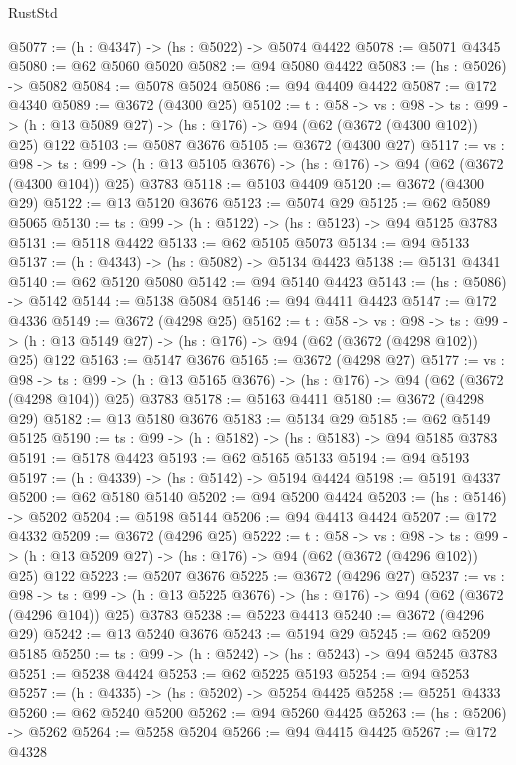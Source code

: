 \begin{lexlean}{RustStd}
\begin{coremodule}
{\begin{coremodule}
{{{{{{{{{{{@5077 := (h : @4347) -> (hs : @5022) -> @5074 @4422
@5078 := @5071 @4345
@5080 := @62 @5060 @5020
@5082 := @94 @5080 @4422
@5083 := (hs : @5026) -> @5082
@5084 := @5078 @5024
@5086 := @94 @4409 @4422
@5087 := @172 @4340
@5089 := @3672 (@4300 @25)
@5102 := {t : @58} ->
  {vs : @98} ->
  {ts : @99} -> (h : @13 @5089 @27) -> (hs : @176) -> @94 (@62 (@3672 (@4300 @102)) @25) @122
@5103 := @5087 @3676
@5105 := @3672 (@4300 @27)
@5117 := {vs : @98} ->
  {ts : @99} -> (h : @13 @5105 @3676) -> (hs : @176) -> @94 (@62 (@3672 (@4300 @104)) @25) @3783
@5118 := @5103 @4409
@5120 := @3672 (@4300 @29)
@5122 := @13 @5120 @3676
@5123 := @5074 @29
@5125 := @62 @5089 @5065
@5130 := {ts : @99} -> (h : @5122) -> (hs : @5123) -> @94 @5125 @3783
@5131 := @5118 @4422
@5133 := @62 @5105 @5073
@5134 := @94 @5133
@5137 := (h : @4343) -> (hs : @5082) -> @5134 @4423
@5138 := @5131 @4341
@5140 := @62 @5120 @5080
@5142 := @94 @5140 @4423
@5143 := (hs : @5086) -> @5142
@5144 := @5138 @5084
@5146 := @94 @4411 @4423
@5147 := @172 @4336
@5149 := @3672 (@4298 @25)
@5162 := {t : @58} ->
  {vs : @98} ->
  {ts : @99} -> (h : @13 @5149 @27) -> (hs : @176) -> @94 (@62 (@3672 (@4298 @102)) @25) @122
@5163 := @5147 @3676
@5165 := @3672 (@4298 @27)
@5177 := {vs : @98} ->
  {ts : @99} -> (h : @13 @5165 @3676) -> (hs : @176) -> @94 (@62 (@3672 (@4298 @104)) @25) @3783
@5178 := @5163 @4411
@5180 := @3672 (@4298 @29)
@5182 := @13 @5180 @3676
@5183 := @5134 @29
@5185 := @62 @5149 @5125
@5190 := {ts : @99} -> (h : @5182) -> (hs : @5183) -> @94 @5185 @3783
@5191 := @5178 @4423
@5193 := @62 @5165 @5133
@5194 := @94 @5193
@5197 := (h : @4339) -> (hs : @5142) -> @5194 @4424
@5198 := @5191 @4337
@5200 := @62 @5180 @5140
@5202 := @94 @5200 @4424
@5203 := (hs : @5146) -> @5202
@5204 := @5198 @5144
@5206 := @94 @4413 @4424
@5207 := @172 @4332
@5209 := @3672 (@4296 @25)
@5222 := {t : @58} ->
  {vs : @98} ->
  {ts : @99} -> (h : @13 @5209 @27) -> (hs : @176) -> @94 (@62 (@3672 (@4296 @102)) @25) @122
@5223 := @5207 @3676
@5225 := @3672 (@4296 @27)
@5237 := {vs : @98} ->
  {ts : @99} -> (h : @13 @5225 @3676) -> (hs : @176) -> @94 (@62 (@3672 (@4296 @104)) @25) @3783
@5238 := @5223 @4413
@5240 := @3672 (@4296 @29)
@5242 := @13 @5240 @3676
@5243 := @5194 @29
@5245 := @62 @5209 @5185
@5250 := {ts : @99} -> (h : @5242) -> (hs : @5243) -> @94 @5245 @3783
@5251 := @5238 @4424
@5253 := @62 @5225 @5193
@5254 := @94 @5253
@5257 := (h : @4335) -> (hs : @5202) -> @5254 @4425
@5258 := @5251 @4333
@5260 := @62 @5240 @5200
@5262 := @94 @5260 @4425
@5263 := (hs : @5206) -> @5262
@5264 := @5258 @5204
@5266 := @94 @4415 @4425
@5267 := @172 @4328
}}}}}}}}}}}
\end{coremodule}}
\end{coremodule}
\end{lexlean}
